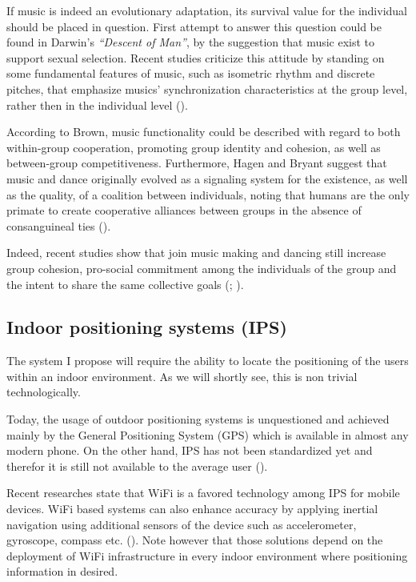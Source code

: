 \documentclass[a4paper,11pt]{article}
\begin{document}
If music is indeed an evolutionary adaptation, its survival value for the individual should be placed in question.
First attempt to answer this question could be found in Darwin's \textit{``Descent of Man''}, by the suggestion that music exist to support sexual selection.
Recent studies criticize this attitude by standing on some fundamental features of music, such as isometric rhythm and discrete pitches, that emphasize musics' synchronization characteristics at the group level, rather then in the individual level (\cite{Brown2000}).

According to Brown, music functionality could be described with regard to both within-group cooperation, promoting group identity and cohesion, as well as between-group competitiveness.
Furthermore, Hagen and Bryant suggest that music and dance originally evolved as a signaling system for the existence, as well as the quality, of a coalition between individuals, noting that humans are the only primate to create cooperative alliances between groups in the absence of consanguineal ties (\cite*{Hagen2003}).

Indeed, recent studies show that join music making and dancing still increase group cohesion, pro-social commitment among the individuals of the group and the intent to share the same collective goals (\cite{Kirschner2010}; \cite{Knoblich2011}).

\subsection{Indoor positioning systems (IPS)}

The system I propose will require the ability to locate the positioning of the users within an indoor environment.
As we will shortly see, this is non trivial technologically.

Today, the usage of outdoor positioning systems is unquestioned and achieved mainly by the General Positioning System (GPS) which is available in almost any modern phone.
On the other hand, IPS has not been standardized yet and therefor it is still not available to the average user (\cite{web:turetsky}).

Recent researches state that WiFi is a favored technology among IPS for mobile devices.
WiFi based systems can also enhance accuracy by applying inertial navigation using additional sensors of the device such as accelerometer, gyroscope, compass etc. (\cite{web:harrop}).
Note however that those solutions depend on the deployment of WiFi infrastructure in every indoor environment where positioning information in desired.
\end{document}
